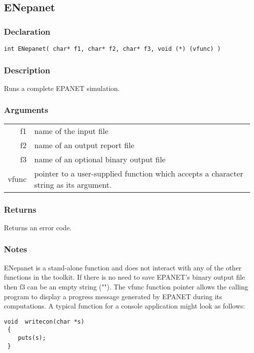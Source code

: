 \subsection{ENepanet}
\subsubsection{Declaration}
\begin{lstlisting}
int ENepanet( char* f1, char* f2, char* f3, void (*) (vfunc) )
\end{lstlisting}

\subsubsection{Description}
Runs a complete EPANET simulation.
\subsubsection{Arguments}
\begin{tabular}{ r p{11cm} }
f1&name of the input file \\[6pt]
f2& name of an output report file \\[6pt]
f3& name of an optional binary output file\\[6pt]
vfunc& pointer to a user-supplied function which accepts a character string as its argument.\\[6pt]
\end{tabular}

 
 
  
\subsubsection{Returns}

 Returns an error code.  
 
  

\subsubsection{Notes}

 ENepanet is a stand-alone function and does not interact with any of the other functions in the toolkit.
 If there is no need to save EPANET's binary output file then f3 can be an empty string ("").
 The vfunc function pointer allows the calling program to display a progress message generated by EPANET 
 during its computations. A typical function for a console application might look as follows:
\begin{lstlisting}
void  writecon(char *s)
 {
    puts(s);
 }
\end{lstlisting}

